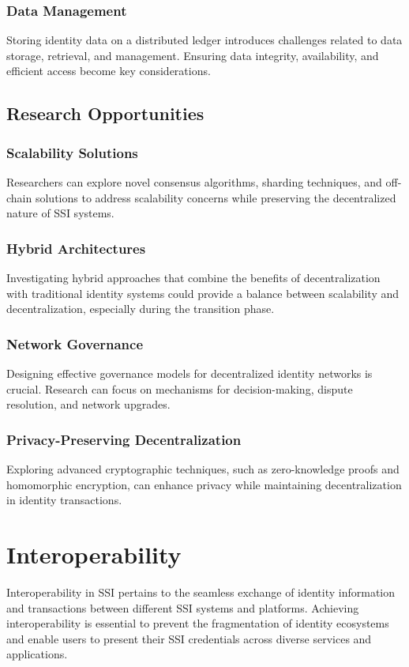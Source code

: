 \subsubsection*{Data Management} Storing identity data on a distributed ledger introduces challenges related to data storage, retrieval, and management. Ensuring data integrity, availability, and efficient access become key considerations.

\subsection*{Research Opportunities}

\subsubsection*{Scalability Solutions} Researchers can explore novel consensus algorithms, sharding techniques, and off-chain solutions to address scalability concerns while preserving the decentralized nature of SSI systems.
\subsubsection*{Hybrid Architectures} Investigating hybrid approaches that combine the benefits of decentralization with traditional identity systems could provide a balance between scalability and decentralization, especially during the transition phase.
\subsubsection*{Network Governance} Designing effective governance models for decentralized identity networks is crucial. Research can focus on mechanisms for decision-making, dispute resolution, and network upgrades.
\subsubsection*{Privacy-Preserving Decentralization} Exploring advanced cryptographic techniques, such as zero-knowledge proofs and homomorphic encryption, can enhance privacy while maintaining decentralization in identity transactions.

\section*{Interoperability} 
Interoperability in SSI pertains to the seamless exchange of identity information and transactions between different SSI systems and platforms. Achieving interoperability is essential to prevent the fragmentation of identity ecosystems and enable users to present their SSI credentials across diverse services and applications.

